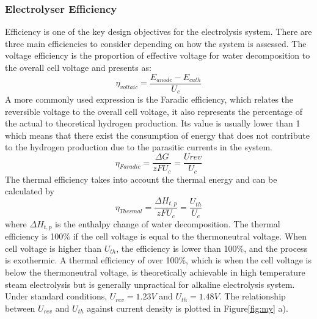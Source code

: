 \subsubsection{Electrolyser Efficiency }  
Efficiency is one of the key design objectives for the electrolysis system. There are three main efficiencies to consider depending on how the system is assessed.\cite{currentdensity} The voltage efficiency is the proportion of effective voltage for water decomposition to the overall cell voltage and presents as:
\begin{equation}
\eta_{voltaic} = \frac{E_{anode} - E_{cath} }{U_c}
\end{equation}
A more commonly used expression is the Faradic efficiency, which relates the reversible voltage to the overall cell voltage, it also represents the percentage of the actual to theoretical hydrogen production. Its value is usually lower than 1 which means that there exist the consumption of energy that does not contribute to the hydrogen production due to the parasitic currents in the system. \cite{currentdensity}
\begin{equation}
\eta_{Faradic} = \frac{\Delta G}{zFU_c} = \frac{U{rev}}{U_c} 
\end{equation}
The thermal efficiency takes into account the thermal energy and can be calculated by
\begin{equation}
\eta_{Thermal} = \frac{\Delta H_{t,p}}{zFU_c} = \frac{U_{th}}{U_c} 
\end{equation} 
where $\Delta H_{t,p}$ is the enthalpy change of water decomposition. The thermal efficiency is 100\% if the cell voltage is equal to the thermoneutral voltage. When cell voltage is higher than $U_{th}$, the efficiency is lower than 100\%, and the process is exothermic. A thermal efficiency of over 100\%, which is when the cell voltage is below the thermoneutral voltage,  is theoretically achievable in high temperature steam electrolysis but is generally unpractical for alkaline electrolysis system. Under standard conditions, $U_{rev} = 1.23V$ and $U_{th} = 1.48V$. The relationship between $U_{rev}$ and $U_{th}$ against current density is plotted in Figure\ref{fig:my} a).
